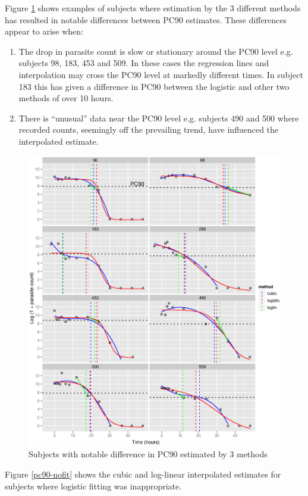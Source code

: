 Figure \ref{pc90-bad} shows examples of subjects where estimation by the 3 different methods has resulted in notable differences between PC90 estimates. These differences appear to arise when:
\begin{enumerate}
\item The drop in parasite count is slow or stationary around the PC90 level e.g. subjects 98, 183, 453 and 509. In these cases the regression lines and interpolation may cross the PC90 level at markedly different times. In subject 183 this has given a difference in PC90 between the logistic and other two methods of over 10 hours.
\item There is ``unusual'' data near the PC90 level e.g. subjects 490 and 500 where recorded counts, seemingly off the prevailing trend, have influenced the interpolated estimate.
\end{enumerate}
\begin{figure}[h]
\includegraphics[width=150mm]{pc90-bad.eps} 
\caption{Subjects with notable difference in PC90 estimated by 3 methods}
\label{pc90-bad}
\end{figure}
Figure \ref{pc90-nofit} shows the cubic and log-linear interpolated estimates for subjects where logistic fitting was inappropriate.
